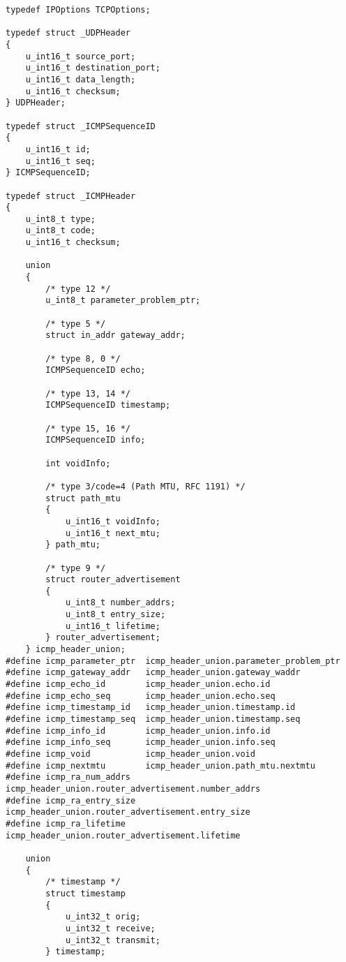\documentclass[english]{report}
\begin{document}
\begin{verbatim}
typedef IPOptions TCPOptions;

typedef struct _UDPHeader
{
    u_int16_t source_port;
    u_int16_t destination_port;
    u_int16_t data_length;
    u_int16_t checksum;
} UDPHeader;

typedef struct _ICMPSequenceID
{
    u_int16_t id;
    u_int16_t seq;
} ICMPSequenceID;

typedef struct _ICMPHeader
{
    u_int8_t type;
    u_int8_t code;
    u_int16_t checksum;

    union
    {
        /* type 12 */
        u_int8_t parameter_problem_ptr;

        /* type 5 */
        struct in_addr gateway_addr;

        /* type 8, 0 */
        ICMPSequenceID echo;

        /* type 13, 14 */
        ICMPSequenceID timestamp;

        /* type 15, 16 */
        ICMPSequenceID info;

        int voidInfo;

        /* type 3/code=4 (Path MTU, RFC 1191) */
        struct path_mtu
        {
            u_int16_t voidInfo;
            u_int16_t next_mtu;
        } path_mtu;

        /* type 9 */
        struct router_advertisement
        {
            u_int8_t number_addrs;
            u_int8_t entry_size;
            u_int16_t lifetime;
        } router_advertisement;
    } icmp_header_union;
#define icmp_parameter_ptr  icmp_header_union.parameter_problem_ptr
#define icmp_gateway_addr   icmp_header_union.gateway_waddr
#define icmp_echo_id        icmp_header_union.echo.id
#define icmp_echo_seq       icmp_header_union.echo.seq
#define icmp_timestamp_id   icmp_header_union.timestamp.id
#define icmp_timestamp_seq  icmp_header_union.timestamp.seq
#define icmp_info_id        icmp_header_union.info.id
#define icmp_info_seq       icmp_header_union.info.seq
#define icmp_void           icmp_header_union.void
#define icmp_nextmtu        icmp_header_union.path_mtu.nextmtu
#define icmp_ra_num_addrs   icmp_header_union.router_advertisement.number_addrs
#define icmp_ra_entry_size  icmp_header_union.router_advertisement.entry_size
#define icmp_ra_lifetime    icmp_header_union.router_advertisement.lifetime

    union
    {
        /* timestamp */
        struct timestamp
        {
            u_int32_t orig;
            u_int32_t receive;
            u_int32_t transmit;
        } timestamp;


\end{verbatim}
\end{document}
